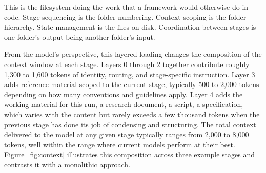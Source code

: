 \documentclass[acmlarge,nonacm,screen]{acmart}
\begin{document}
This is the filesystem doing the work that a framework would otherwise do in code. Stage sequencing is the folder numbering. Context scoping is the folder hierarchy. State management is the files on disk. Coordination between stages is one folder's output being another folder's input.

From the model's perspective, this layered loading changes the composition of the context window at each stage. Layers 0 through 2 together contribute roughly 1,300 to 1,600 tokens of identity, routing, and stage-specific instruction. Layer 3 adds reference material scoped to the current stage, typically 500 to 2,000 tokens depending on how many conventions and guidelines apply. Layer 4 adds the working material for this run, a research document, a script, a specification, which varies with the content but rarely exceeds a few thousand tokens when the previous stage has done its job of condensing and structuring. The total context delivered to the model at any given stage typically ranges from 2,000 to 8,000 tokens, well within the range where current models perform at their best. Figure~\ref{fig:context} illustrates this composition across three example stages and contrasts it with a monolithic approach.
\end{document}
